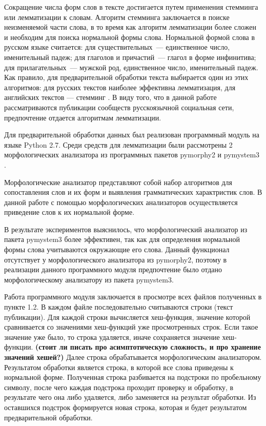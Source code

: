 \documentclass[a4paper]{report}
\begin{document}
	
	Сокращение числа форм слов в тексте достигается путем применения стемминга или лемматизации к словам. Алгоритм стемминга заключается в поиске неизменяемой части слова, в то время как алгоритм лемматизации более сложен и необходим для поиска нормальной формы слова. Нормальной формой слова в русском языке считается: для существительных~--- единственное число, именительный падеж; для глаголов и причастий~--- глагол в форме инфинитива; для прилагательных~--- мужской род, единственное число, именительный падеж. Как правило, для предварительной обработки текста выбирается один из этих алгоритмов: для русских текстов наиболее эффективна лемматизация, для английских текстов --- стемминг \cite{bib:Voron1}. В виду того, что в данной работе рассматриваются публикации сообществ русскоязычной социальная сети, предпочтение отдается алгоритмам лемматизации.
	
	 
	
	Для предварительной обработки данных был реализован программный модуль на языке Python 2.7. Среди средств для лемматизации были рассмотрены 2 морфологических анализатора из программных пакетов pymorphy2 \cite{bib:pymorphy2} и pymystem3 \cite{bib:pymystem3}. 
	
	Морфологические анализатор представляют собой набор алгоритмов для сопоставления слов и их форм и выявления грамматических характристик слов. В данной работе с помощью морфологических анализаторов осуществляется приведение слов к их нормальной форме.
	
	В результате экспериментов выяснилось, что морфологический анализатор из пакета pymystem3 более эффективен, так как для определения нормальной формы слова учитываются окружающие его слова. Данный функционал отсутствует у морфологического анализатора из pymorphy2, поэтому в реализации данного программного модуля предпочтение было отдано морфологическому анализатору из пакета pymystem3.
	
	
	
	Работа программного модуля заключается в просмотре всех файлов полученных в пункте 1.2. 
	В каждом файле последовательно считываются строки (текст публикации). Для каждой строки вычисляется хеш-функция, значение которой сравнивается со значениями хеш-функций уже просмотренных строк. Если такое значение уже было, то строка удаляется, иначе сохраняется значение хеш-функции. \textbf{(стоит ли писать про асимптотическую сложность, и про хранение значений хешей?)}
	Далее строка обрабатывается морфологическим анализатором. Результатом обработки является строка, в которой все слова приведены к нормальной форме.
	Полученная строка разбивается на подстроки по пробельному символу, после чего каждая подстрока проходит проверку и обработку, в результате чего она либо удаляется, либо заменяется на результат обработки. Из оставшихся подстрок формируется новая строка, которая и будет результатом предварительной обработки.
	
\end{document}
